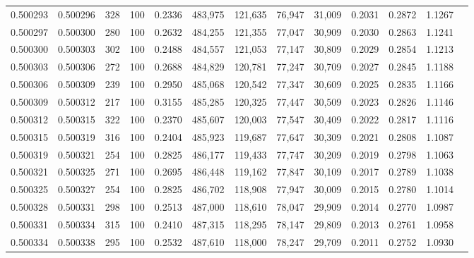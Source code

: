 \begin{tabular}{rrrrrrrrrrrrr}
0.500293 & 0.500296 &   328 & 100 &                                     0.2336 & 483,975 & 121,635 &  76,947 &  31,009 & 0.2031 & 0.2872 & 1.1267 \\
0.500297 & 0.500300 &   280 & 100 &                                     0.2632 & 484,255 & 121,355 &  77,047 &  30,909 & 0.2030 & 0.2863 & 1.1241 \\
0.500300 & 0.500303 &   302 & 100 &                                     0.2488 & 484,557 & 121,053 &  77,147 &  30,809 & 0.2029 & 0.2854 & 1.1213 \\
0.500303 & 0.500306 &   272 & 100 &                                     0.2688 & 484,829 & 120,781 &  77,247 &  30,709 & 0.2027 & 0.2845 & 1.1188 \\
0.500306 & 0.500309 &   239 & 100 &                                     0.2950 & 485,068 & 120,542 &  77,347 &  30,609 & 0.2025 & 0.2835 & 1.1166 \\
0.500309 & 0.500312 &   217 & 100 &                                     0.3155 & 485,285 & 120,325 &  77,447 &  30,509 & 0.2023 & 0.2826 & 1.1146 \\
0.500312 & 0.500315 &   322 & 100 &                                     0.2370 & 485,607 & 120,003 &  77,547 &  30,409 & 0.2022 & 0.2817 & 1.1116 \\
0.500315 & 0.500319 &   316 & 100 &                                     0.2404 & 485,923 & 119,687 &  77,647 &  30,309 & 0.2021 & 0.2808 & 1.1087 \\
0.500319 & 0.500321 &   254 & 100 &                                     0.2825 & 486,177 & 119,433 &  77,747 &  30,209 & 0.2019 & 0.2798 & 1.1063 \\
0.500321 & 0.500325 &   271 & 100 &                                     0.2695 & 486,448 & 119,162 &  77,847 &  30,109 & 0.2017 & 0.2789 & 1.1038 \\
0.500325 & 0.500327 &   254 & 100 &                                     0.2825 & 486,702 & 118,908 &  77,947 &  30,009 & 0.2015 & 0.2780 & 1.1014 \\
0.500328 & 0.500331 &   298 & 100 &                                     0.2513 & 487,000 & 118,610 &  78,047 &  29,909 & 0.2014 & 0.2770 & 1.0987 \\
0.500331 & 0.500334 &   315 & 100 &                                     0.2410 & 487,315 & 118,295 &  78,147 &  29,809 & 0.2013 & 0.2761 & 1.0958 \\
0.500334 & 0.500338 &   295 & 100 &                                     0.2532 & 487,610 & 118,000 &  78,247 &  29,709 & 0.2011 & 0.2752 & 1.0930 \\

\end{tabular}
